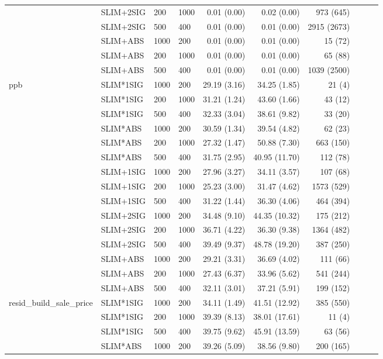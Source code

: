 \begin{longtable}{llllrrrrrr}
 & SLIM+2SIG & 200 & 1000 & 0.01 (0.00) & 0.02 (0.00) & 973 (645) \\
 & SLIM+2SIG & 500 & 400 & 0.01 (0.00) & 0.01 (0.00) & 2915 (2673) \\
 & SLIM+ABS & 1000 & 200 & 0.01 (0.00) & 0.01 (0.00) & 15 (72) \\
 & SLIM+ABS & 200 & 1000 & 0.01 (0.00) & 0.01 (0.00) & 65 (88) \\
 & SLIM+ABS & 500 & 400 & 0.01 (0.00) & 0.01 (0.00) & 1039 (2500) \\
\midrule
ppb & SLIM*1SIG & 1000 & 200 & 29.19 (3.16) & 34.25 (1.85) & 21 (4) \\
 & SLIM*1SIG & 200 & 1000 & 31.21 (1.24) & 43.60 (1.66) & 43 (12) \\
 & SLIM*1SIG & 500 & 400 & 32.33 (3.04) & 38.61 (9.82) & 33 (20) \\
 & SLIM*ABS & 1000 & 200 & 30.59 (1.34) & 39.54 (4.82) & 62 (23) \\
 & SLIM*ABS & 200 & 1000 & 27.32 (1.47) & 50.88 (7.30) & 663 (150) \\
 & SLIM*ABS & 500 & 400 & 31.75 (2.95) & 40.95 (11.70) & 112 (78) \\
 & SLIM+1SIG & 1000 & 200 & 27.96 (3.27) & 34.11 (3.57) & 107 (68) \\
 & SLIM+1SIG & 200 & 1000 & 25.23 (3.00) & 31.47 (4.62) & 1573 (529) \\
 & SLIM+1SIG & 500 & 400 & 31.22 (1.44) & 36.30 (4.06) & 464 (394) \\
 & SLIM+2SIG & 1000 & 200 & 34.48 (9.10) & 44.35 (10.32) & 175 (212) \\
 & SLIM+2SIG & 200 & 1000 & 36.71 (4.22) & 36.30 (9.38) & 1364 (482) \\
 & SLIM+2SIG & 500 & 400 & 39.49 (9.37) & 48.78 (19.20) & 387 (250) \\
 & SLIM+ABS & 1000 & 200 & 29.21 (3.31) & 36.69 (4.02) & 111 (66) \\
 & SLIM+ABS & 200 & 1000 & 27.43 (6.37) & 33.96 (5.62) & 541 (244) \\
 & SLIM+ABS & 500 & 400 & 32.11 (3.01) & 37.21 (5.91) & 199 (152) \\
\midrule
resid_build_sale_price & SLIM*1SIG & 1000 & 200 & 34.11 (1.49) & 41.51 (12.92) & 385 (550) \\
 & SLIM*1SIG & 200 & 1000 & 39.39 (8.13) & 38.01 (17.61) & 11 (4) \\
 & SLIM*1SIG & 500 & 400 & 39.75 (9.62) & 45.91 (13.59) & 63 (56) \\
 & SLIM*ABS & 1000 & 200 & 39.26 (5.09) & 38.56 (9.80) & 200 (165) \\

\end{longtable}

